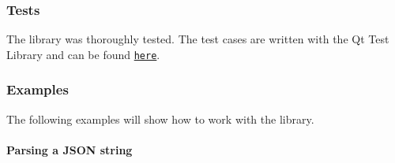 \subsubsection*{\label{_tests_section}%
Tests}

The library was thoroughly tested. The test cases are written with the Qt Test Library and can be found \href{https://github.com/n0dex/cppjsonlib/tree/master/json_library_tests}{\tt here}.

\subsubsection*{\label{_expamles_section}%
Examples}

The following examples will show how to work with the library.

\paragraph*{\label{_parsing_json_string_section}%
Parsing a J\+S\+ON string}


